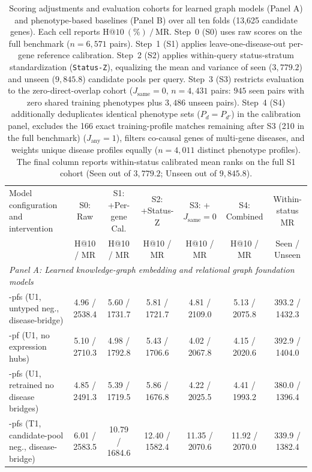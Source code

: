 \begin{table}[tb]
\centering\scriptsize
\renewcommand{\arraystretch}{0.86}
\setlength{\tabcolsep}{1.6pt}
\caption{Scoring adjustments and evaluation cohorts for learned graph models (Panel A) and phenotype-based baselines (Panel B) over all ten folds (13,625 candidate genes). Each cell reports $\mathrm{H@10~(\%)}~/~\mathrm{MR}$. Step~0 (S0) uses raw scores on the full benchmark ($n=6{,}571$ pairs). Step~1 (S1) applies leave-one-disease-out per-gene reference calibration. Step~2 (S2) applies within-query status-stratum standardization (\texttt{Status-Z}), equalizing the mean and variance of seen ($3{,}779.2$) and unseen ($9{,}845.8$) candidate pools per query. Step~3 (S3) restricts evaluation to the zero-direct-overlap cohort ($J_{\mathrm{same}}=0$, $n=4{,}431$ pairs: $945$ seen pairs with zero shared training phenotypes plus $3{,}486$ unseen pairs). Step~4 (S4) additionally deduplicates identical phenotype sets ($P_d=P_{d'}$) in the calibration panel, excludes the 166 exact training-profile matches remaining after S3 (210 in the full benchmark) ($J_{\mathrm{any}}=1$), filters co-causal genes of multi-gene diseases, and weights unique disease profiles equally ($n=4{,}011$ distinct phenotype profiles). The final column reports within-status calibrated mean ranks on the full S1 cohort (Seen out of $3{,}779.2$; Unseen out of $9{,}845.8$).}
\label{tab:bias_stepwise}
\begin{tabular}{lcccccc}
\toprule
Model configuration and intervention & S0: Raw & S1: +Per-gene Cal. & S2: +Status-Z & S3: +$J_{\mathrm{same}}{=}0$ & S4: Combined & Within-status MR \\
 & H@10 / MR & H@10 / MR & H@10 / MR & H@10 / MR & H@10 / MR & Seen / Unseen \\
\midrule
\multicolumn{7}{l}{\emph{Panel A: Learned knowledge-graph embedding and relational graph foundation models}} \\
\method{}-pfs (U1, untyped neg., disease-bridge) & 4.96 / 2538.4 & 5.60 / 1731.7 & 5.81 / 1721.7 & 4.81 / 2109.0 & 5.13 / 2075.8 & 393.2 / 1432.3 \\
\method{}-pf (U1, no expression hubs) & 5.10 / 2710.3 & 4.98 / 1792.8 & 5.43 / 1706.6 & 4.02 / 2067.8 & 4.15 / 2020.6 & 392.9 / 1404.0 \\
\method{}-pfs (U1, retrained no disease bridges) & 4.85 / 2491.3 & 5.39 / 1719.5 & 5.86 / 1676.8 & 4.22 / 2025.5 & 4.41 / 1993.2 & 380.0 / 1396.4 \\
\method{}-pfs (T1, candidate-pool neg., disease-bridge) & 6.01 / 2583.5 & 10.79 / 1684.6 & 12.40 / 1582.4 & 11.35 / 2070.6 & 11.92 / 2070.0 & 339.9 / 1382.4 \\

\end{tabular}
\end{table}
